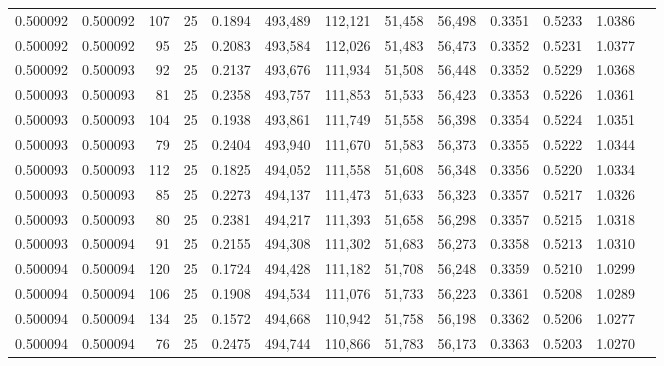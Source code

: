 \begin{tabular}{rrrrrrrrrrrrr}
0.500092 & 0.500092 &   107 &  25 &                                     0.1894 & 493,489 & 112,121 &  51,458 &  56,498 & 0.3351 & 0.5233 & 1.0386 \\
0.500092 & 0.500092 &    95 &  25 &                                     0.2083 & 493,584 & 112,026 &  51,483 &  56,473 & 0.3352 & 0.5231 & 1.0377 \\
0.500092 & 0.500093 &    92 &  25 &                                     0.2137 & 493,676 & 111,934 &  51,508 &  56,448 & 0.3352 & 0.5229 & 1.0368 \\
0.500093 & 0.500093 &    81 &  25 &                                     0.2358 & 493,757 & 111,853 &  51,533 &  56,423 & 0.3353 & 0.5226 & 1.0361 \\
0.500093 & 0.500093 &   104 &  25 &                                     0.1938 & 493,861 & 111,749 &  51,558 &  56,398 & 0.3354 & 0.5224 & 1.0351 \\
0.500093 & 0.500093 &    79 &  25 &                                     0.2404 & 493,940 & 111,670 &  51,583 &  56,373 & 0.3355 & 0.5222 & 1.0344 \\
0.500093 & 0.500093 &   112 &  25 &                                     0.1825 & 494,052 & 111,558 &  51,608 &  56,348 & 0.3356 & 0.5220 & 1.0334 \\
0.500093 & 0.500093 &    85 &  25 &                                     0.2273 & 494,137 & 111,473 &  51,633 &  56,323 & 0.3357 & 0.5217 & 1.0326 \\
0.500093 & 0.500093 &    80 &  25 &                                     0.2381 & 494,217 & 111,393 &  51,658 &  56,298 & 0.3357 & 0.5215 & 1.0318 \\
0.500093 & 0.500094 &    91 &  25 &                                     0.2155 & 494,308 & 111,302 &  51,683 &  56,273 & 0.3358 & 0.5213 & 1.0310 \\
0.500094 & 0.500094 &   120 &  25 &                                     0.1724 & 494,428 & 111,182 &  51,708 &  56,248 & 0.3359 & 0.5210 & 1.0299 \\
0.500094 & 0.500094 &   106 &  25 &                                     0.1908 & 494,534 & 111,076 &  51,733 &  56,223 & 0.3361 & 0.5208 & 1.0289 \\
0.500094 & 0.500094 &   134 &  25 &                                     0.1572 & 494,668 & 110,942 &  51,758 &  56,198 & 0.3362 & 0.5206 & 1.0277 \\
0.500094 & 0.500094 &    76 &  25 &                                     0.2475 & 494,744 & 110,866 &  51,783 &  56,173 & 0.3363 & 0.5203 & 1.0270 \\

\end{tabular}
